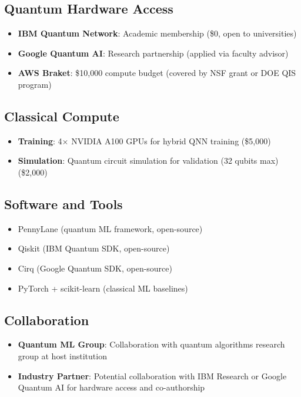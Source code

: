 \documentclass[11pt]{article}
\begin{document}
\subsection{Quantum Hardware Access}

\begin{itemize}
    \item \textbf{IBM Quantum Network}: Academic membership (\$0, open to universities)
    \item \textbf{Google Quantum AI}: Research partnership (applied via faculty advisor)
    \item \textbf{AWS Braket}: \$10,000 compute budget (covered by NSF grant or DOE QIS program)
\end{itemize}

\subsection{Classical Compute}

\begin{itemize}
    \item \textbf{Training}: 4$\times$ NVIDIA A100 GPUs for hybrid QNN training (\$5,000)
    \item \textbf{Simulation}: Quantum circuit simulation for validation (32 qubits max) (\$2,000)
\end{itemize}

\subsection{Software and Tools}

\begin{itemize}
    \item PennyLane (quantum ML framework, open-source)
    \item Qiskit (IBM Quantum SDK, open-source)
    \item Cirq (Google Quantum SDK, open-source)
    \item PyTorch + scikit-learn (classical ML baselines)
\end{itemize}

\subsection{Collaboration}

\begin{itemize}
    \item \textbf{Quantum ML Group}: Collaboration with quantum algorithms research group at host institution
    \item \textbf{Industry Partner}: Potential collaboration with IBM Research or Google Quantum AI for hardware access and co-authorship
\end{itemize}
\end{document}

